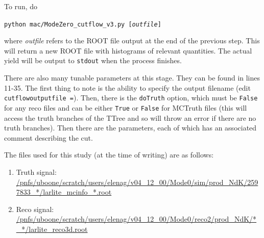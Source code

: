 \documentclass[a4paper, 10pt]{article}
\begin{document}
To run, do

\texttt{python mac/ModeZero\_cutflow\_v3.py [\textit{outfile}]}

\noindent
where \textit{outfile} refers to the ROOT file output at the end of the previous step. This will return a new ROOT file with histograms of relevant quantities. The actual yield will be output to \texttt{stdout} when the process finishes.

There are also many tunable parameters at this stage. They can be found in lines 11-35. The first thing to note is the ability to specify the output filename (edit \texttt{cutflowoutputfile =}). Then, there is the \texttt{doTruth} option, which must be \texttt{False} for any reco files and can be either \texttt{True} or \texttt{False} for MCTruth files (this will access the truth branches of the TTree and so will throw an error if there are no truth branches). Then there are the parameters, each of which has an associated comment describing the cut.

The files used for this study (at the time of writing) are as follows:
\begin{enumerate}[topsep=10pt,itemsep=-1ex,partopsep=10pt,parsep=1ex]
\item Truth signal: \url{/pnfs/uboone/scratch/users/elenag/v04_12_00/Mode0/sim/prod_NdK/2597833_*/larlite_mcinfo_*.root}
\item Reco signal: \url{/pnfs/uboone/scratch/users/elenag/v04_12_00/Mode0/reco2/prod_NdK/*_*/larlite_reco3d.root}
\end{enumerate}
\end{document}
